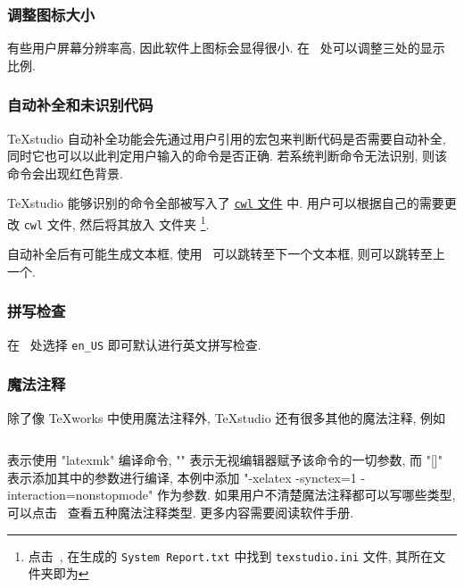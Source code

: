 \subsubsection{调整图标大小}

有些用户屏幕分辨率高,
因此软件上图标会显得很小.
在\  处可以调整三处的显示比例.

\subsubsection{自动补全和未识别代码}

\TeX studio 自动补全功能会先通过用户引用的宏包来判断代码是否需要自动补全,
同时它也可以以此判定用户输入的命令是否正确.
若系统判断命令无法识别,
则该命令会出现红色背景.

\TeX studio 能够识别的命令全部被写入了
\href{https://github.com/texstudio-org/texstudio/tree/master/completion}{\texttt{cwl} 文件}
中.
用户可以根据自己的需要更改 \texttt{cwl} 文件,
然后将其放入
文件夹%
\footnote{点击\ ,
在生成的 \texttt{System Report.txt} 中找到 \texttt{texstudio.ini} 文件,
其所在文件夹即为 }.

自动补全后有可能生成文本框,
使用\ \keys{\ctrl + \arrowkey{>}} 可以跳转至下一个文本框,
\keys{\ctrl + \arrowkey{<}} 则可以跳转至上一个.

\subsubsection{拼写检查}

在\ 
处选择 \texttt{en\_US} 即可默认进行英文拼写检查.

\subsubsection{魔法注释}

除了像 \TeX works 中使用魔法注释外, \TeX studio 还有很多其他的魔法注释, 例如
\begin{lstlisting}[language = {[LaTeX]TeX}]
  % !TeX TXS-program:compile = txs:///latexmk/{}[-xelatex -synctex=1 -interaction=nonstopmode ?me"]
\end{lstlisting}
表示使用 "latexmk" 编译命令,
"{}" 表示无视编辑器赋予该命令的一切参数,
而 "[]" 表示添加其中的参数进行编译,
本例中添加 "-xelatex -synctex=1 -interaction=nonstopmode" 作为参数.
如果用户不清楚魔法注释都可以写哪些类型,
可以点击\  查看五种魔法注释类型.
更多内容需要阅读软件手册.

